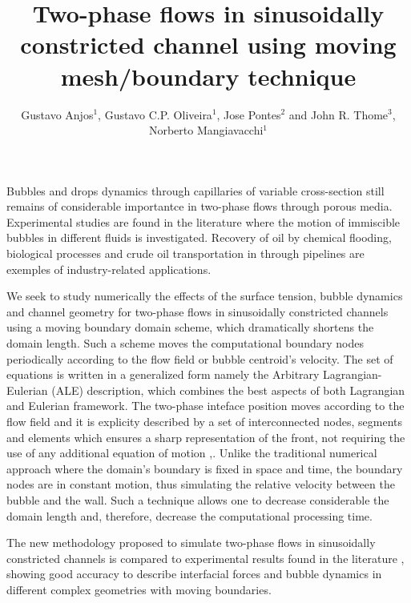 \documentclass{Eccomas}
\title{Two-phase flows in sinusoidally constricted channel using moving
mesh/boundary technique}
\author{Gustavo Anjos$^{1}$, Gustavo C.P. Oliveira$^{1}$, Jose Pontes$^{2}$
and John R. Thome$^{3}$, Norberto Mangiavacchi$^{1}$}
\begin{document}
Bubbles and drops dynamics through capillaries of variable cross-section
still remains of considerable importantce in two-phase flows through
porous media. Experimental studies are found in the literature where the
motion of immiscible bubbles in different fluids is investigated.
Recovery of oil by chemical flooding, biological processes and crude oil
transportation in through pipelines are exemples of industry-related
applications. 

We seek to study numerically the effects of the surface tension, bubble
dynamics and channel geometry for two-phase flows in sinusoidally
constricted channels using a moving boundary domain scheme, which
dramatically shortens the domain length. Such a scheme moves the
computational boundary nodes periodically according to the flow field or
bubble centroid's velocity. The set of equations is written in a
generalized form namely the Arbitrary Lagrangian-Eulerian (ALE)
description, which combines the best aspects of both Lagrangian and
Eulerian framework. The two-phase inteface position moves according to
the flow field and it is explicity described by a set of interconnected
nodes, segments and elements which ensures a sharp representation of the
front, not requiring the use of any additional equation of motion
\cite{anjos2012},\cite{anjos2014}. Unlike the traditional numerical
approach where the domain's boundary is fixed in space and time, the
boundary nodes are in constant motion, thus simulating the relative
velocity between the bubble and the wall. Such a technique allows one to
decrease considerable the domain length and, therefore, decrease the
computational processing time. 

The new methodology proposed to simulate two-phase flows in sinusoidally
constricted channels is compared to experimental results found in the
literature \cite{olbricht1983},\cite{hemmat1996} showing good accuracy
to describe interfacial forces and bubble dynamics in different complex
geometries with moving boundaries. 

%
%
\end{document}
